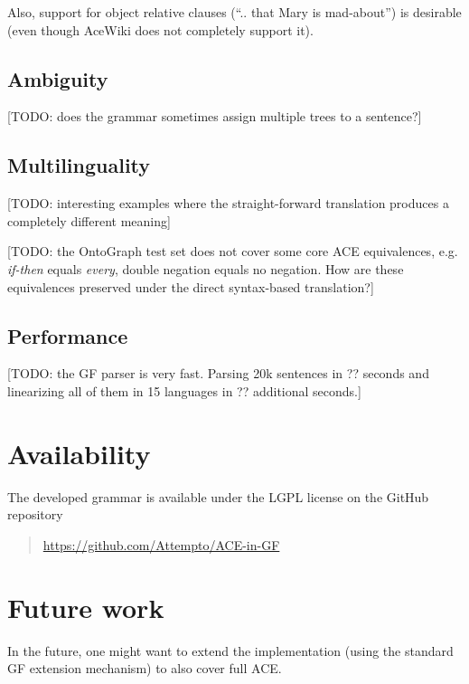 \documentclass[a4paper]{article}
\begin{document}
Also, support for object relative clauses (``.. that Mary is mad-about'')
is desirable (even though AceWiki does not completely support it).


\subsection{Ambiguity}

[TODO: does the grammar sometimes assign multiple trees to a sentence?]

\subsection{Multilinguality}

[TODO: interesting examples where the straight-forward translation produces
a completely different meaning]

[TODO: the OntoGraph test set does not cover some core ACE equivalences,
e.g. \emph{if-then} equals \emph{every}, double negation equals no negation.
How are these equivalences preserved under the direct syntax-based
translation?]

\subsection{Performance}

[TODO: the GF parser is very fast. Parsing 20k sentences in ?? seconds
and linearizing all of them in 15 languages in ?? additional seconds.]

\section{Availability}

The developed grammar is available under the LGPL license on the GitHub
repository

\begin{quote}
\url{https://github.com/Attempto/ACE-in-GF}
\end{quote}

\section{Future work}

In the
future, one might want to extend the implementation (using
the standard GF extension mechanism) to also cover full ACE.



%
\end{document}
